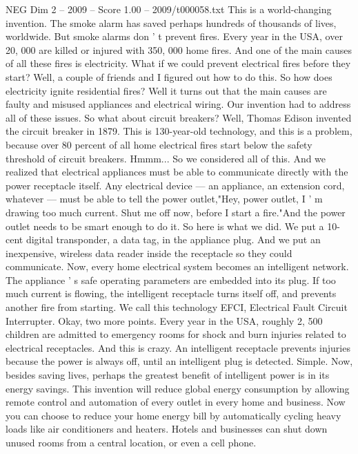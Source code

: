 \begin{textsample}{NEG Dim 2 – 2009 – Score 1.00 – 2009/t000058.txt}  \label{ex:f2_neg_006}
This is a world-changing invention.
The smoke alarm has saved perhaps hundreds of thousands of lives, worldwide.
But smoke alarms don ' t prevent fires.
Every year in the USA, over 20, 000 are killed or injured with 350, 000 home fires.
And one of the main causes of all these fires is electricity.
What if we could prevent electrical fires before they start?
Well, a couple of friends and I figured out how to do this.
So how does electricity ignite residential fires?
Well it turns out that the main causes are faulty and misused appliances and electrical wiring.
Our invention had to address all of these issues.
So what about circuit breakers?
Well, Thomas Edison invented the circuit breaker in 1879.
This is 130-year-old technology, and this is a problem, because over 80 percent of all home electrical fires start below the safety threshold of circuit breakers.
Hmmm...
So we considered all of this.
And we realized that electrical appliances must be able to communicate directly with the power receptacle itself.
Any electrical device — an appliance, an extension cord, whatever — must be able to tell the power outlet,"Hey, power outlet, I ' m drawing too much current.
Shut me off now, before I start a fire."And the power outlet needs to be smart enough to do it.
So here is what we did.
We put a 10-cent digital transponder, a data tag, in the appliance plug.
And we put an inexpensive, wireless data reader inside the receptacle so they could communicate.
Now, every home electrical system becomes an intelligent network.
The appliance ' s safe operating parameters are embedded into its plug.
If too much current is flowing, the intelligent receptacle turns itself off, and prevents another fire from starting.
We call this technology EFCI, Electrical Fault Circuit Interrupter.
Okay, two more points.
Every year in the USA, roughly 2, 500 children are admitted to emergency rooms for shock and burn injuries related to electrical receptacles.
And this is crazy.
An intelligent receptacle prevents injuries because the power is always off, until an intelligent plug is detected.
Simple.
Now, besides saving lives, perhaps the greatest benefit of intelligent power is in its energy savings.
This invention will reduce global energy consumption by allowing remote control and automation of every outlet in every home and business.
Now you can choose to reduce your home energy bill by automatically cycling heavy loads like air conditioners and heaters.
Hotels and businesses can shut down unused rooms from a central location, or even a cell phone.

\end{textsample}
